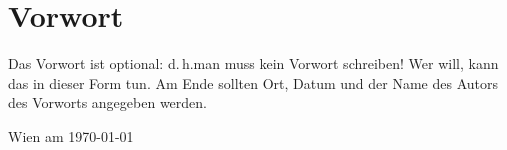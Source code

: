 \chapter*{Vorwort}
Das Vorwort ist optional: d.\,h.\@ man muss kein Vorwort schreiben! Wer will,
kann das in dieser Form tun. Am Ende sollten Ort, Datum und der Name des Autors
des Vorworts angegeben werden. 


\begin{flushleft}
Wien am \today
\end{flushleft}
\begin{flushright}
\makeatletter\@AutorIn\makeatother
\end{flushright}
